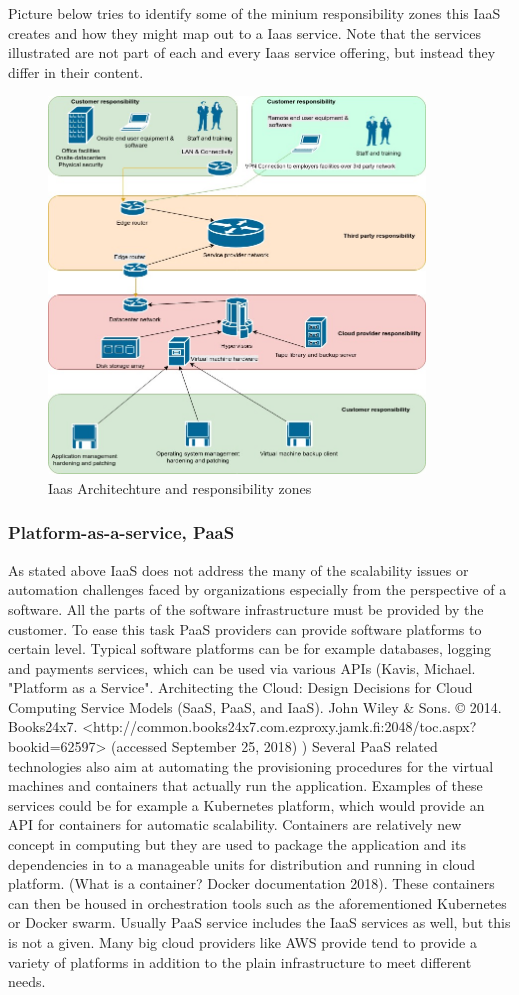 \documentclass{article}
\begin{document}
Picture below tries to identify some of the minium responsibility zones this IaaS creates and how they might map out to a Iaas service. Note that the services illustrated are not part of each and every Iaas service offering, but instead they differ in their content.
\begin{figure}
    \includegraphics[width=10cm,height=10cm]{thesis_iaas.jpg}
    \caption{Iaas Architechture and responsibility zones}
    \label{Figure:IaaS architechture}
\end{figure}
\subsubsection{Platform-as-a-service, PaaS}
As stated above IaaS does not address the many of the scalability issues or automation challenges faced by organizations especially from the perspective of a software. All the parts of the software infrastructure must be provided by the customer. To ease this task PaaS providers can provide software platforms to certain level. Typical software platforms can be for example databases, logging and payments services, which can be used via various APIs (Kavis, Michael. "Platform as a Service". Architecting the Cloud: Design Decisions for Cloud Computing Service Models (SaaS, PaaS, and IaaS). John Wiley \& Sons. © 2014. Books24x7. <http://common.books24x7.com.ezproxy.jamk.fi:2048/toc.aspx?bookid=62597> (accessed September 25, 2018) )
Several PaaS related technologies also aim at automating the provisioning procedures for the virtual machines and containers that actually run the application. Examples of these services could be for example a Kubernetes platform, which would provide an API for containers for automatic scalability. Containers are relatively new concept in computing but they are used to package the application and its dependencies in to a manageable units for distribution and running in cloud platform. (What is a container? Docker documentation 2018). These containers can then be housed in orchestration tools such as the aforementioned Kubernetes or Docker swarm. 
Usually PaaS service includes the IaaS services as well, but this is not a given. Many big cloud providers like AWS provide tend to provide a variety of platforms in addition to the plain infrastructure to meet different needs.
\end{document}
